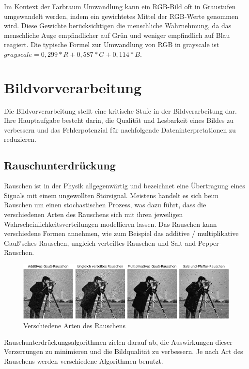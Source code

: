 Im Kontext der Farbraum Umwandlung kann ein RGB-Bild oft in Graustufen umgewandelt werden, indem ein gewichtetes Mittel der RGB-Werte genommen wird. 
Diese Gewichte berücksichtigen die menschliche Wahrnehmung, da das menschliche Auge empfindlicher auf Grün und weniger empfindlich auf Blau reagiert.
Die typische Formel zur Umwandlung von RGB in grayscale ist \(grayscale = 0,299*R + 0,587*G + 0,114*B\).~\cite{Dr._Daniel_Slieter_2023_dhbw-stuttgart}

\section{Bildvorverarbeitung}
Die Bildvorverarbeitung stellt eine kritische Stufe in der Bildverarbeitung dar. Ihre Hauptaufgabe besteht darin, 
die Qualität und Lesbarkeit eines Bildes zu verbessern und das Fehlerpotenzial für nachfolgende Dateninterpretationen zu reduzieren.

\subsection{Rauschunterdrückung}
Rauschen ist in der Physik allgegenwärtig und bezeichnet eine Übertragung eines Signals mit einem ungewollten Störsignal.
Meistens handelt es sich beim Rauschen um einen stochastischen Prozess, was dazu führt, dass die verschiedenen Arten des Rauschens sich mit
ihren jeweiligen Wahrscheinlichkeitsverteilungen modellieren lassen.
Das Rauschen kann verschiedene Formen annehmen, wie zum Beispiel das additive / multiplikative Gauß'sches Rauschen, ungleich verteiltes Rauschen
und Salt-and-Pepper-Rauschen. 

\begin{figure}[ht]
    \centering
    \includegraphics[scale=0.8]{images/noise.png}
    \caption{Verschiedene Arten des Rauschens}
\end{figure}

Rauschunterdrückungsalgorithmen zielen darauf ab, die Auswirkungen dieser Verzerrungen zu minimieren und die Bildqualität zu verbessern.
Je nach Art des Rauschens werden verschiedene Algorithmen benutzt.~\cite{Hannes_Bonasch_2023}

